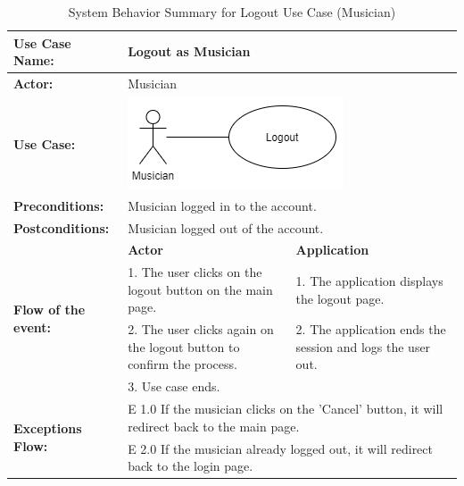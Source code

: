\begin{longtable}{|p{3cm}|p{5cm}|p{5cm}|}
    \caption{\centering System Behavior Summary for Logout Use Case (Musician)} \\
    \hline
    \textbf{Use Case Name:} & \multicolumn{2}{l|}{Logout as Musician} \\ \hline
    \textbf{Actor:} & \multicolumn{2}{l|}{Musician} \\ \hline
    \textbf{Use Case:} & \multicolumn{2}{l|}{\includegraphics[width=0.5\linewidth]{mainmatter/images/sucd6.png}} \\ \hline
    \textbf{Preconditions:} & \multicolumn{2}{p{10cm}|}{Musician logged in to the account.} \\ \hline
    \textbf{Postconditions:} & \multicolumn{2}{p{10cm}|}{Musician logged out of the account.} \\ \hline
    \multirow{4}{3cm}{\raggedright \textbf{Flow of the event:}} & \textbf{Actor} & \textbf{Application} \\ \cline{2-3}
    & 1. The user clicks on the logout button on the main page. & 1. The application displays the logout page. \\ \cline{2-3}
    & 2. The user clicks again on the logout button to confirm the process. & 2. The application ends the session and logs the user out.  \\ \cline{2-3}
    & 3. Use case ends. &  \\ \hline
    \multirow{2}{3cm}{\raggedright \textbf{Exceptions Flow:}} & \multicolumn{2}{p{10cm}|}{\raggedright E 1.0 If the musician clicks on the 'Cancel' button, it will redirect back to the main page.} \\ \cline{2-3}
    & \multicolumn{2}{p{10cm}|}{\raggedright E 2.0 If the musician already logged out, it will redirect back to the login page.} \\ \hline
\end{longtable}
\pagebreak


